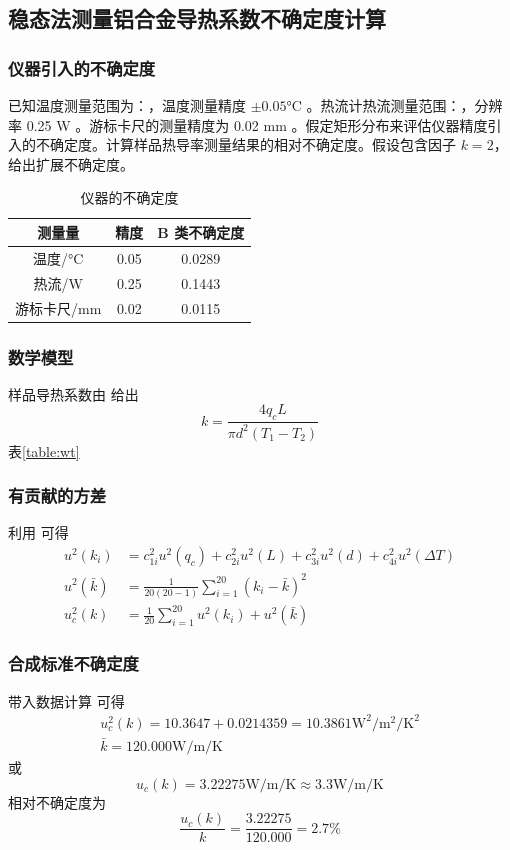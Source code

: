 \documentclass[a4paper,utf8]{article}
\newcommand{\TTR}[0]{\watt\per\m\per\K}
\begin{document}
\subsection{稳态法测量铝合金导热系数不确定度计算}
\subsubsection{仪器引入的不确定度}
已知温度测量范围为：，温度测量精度 $\pm 0.05 \unit{\degreeCelsius}$ 。热流计热流测量范围：\linebreak {}，分辨率 0.25 \unit{\watt} 。游标卡尺的测量精度为 0.02 \unit{\mm} 。假定矩形分布来评估仪器精度引入的不确定度。计算样品热导率测量结果的相对不确定度。假设包含因子 $k=2$，给出扩展不确定度。
\begin{table}[!ht]
    \caption{仪器的不确定度}
    \begin{tabularx}{0.7\textwidth}{*{3}{C}}\toprule
        测量量 & 精度 & B 类不确定度 \\ \midrule
        温度/\unit{\degreeCelsius} & 0.05 & 0.0289 \\
        热流/\unit{\W} & 0.25 & 0.1443 \\
        游标卡尺/\unit{\mm} & 0.02 & 0.0115 \\ \bottomrule
    \end{tabularx}
\end{table}
\subsubsection{数学模型}
    样品导热系数由 给出
    \begin{equation}
        k=\frac{4q_c L}{\pi d^2(T_1-T_2)} \label{eq:4}
    \end{equation}
    表\ref{table:wt}
\subsubsection{有贡献的方差}
利用 可得
\begin{align}
    u^2(k_i)&=c_{1i}^2u^2(q_c)+c_{2i}^2u^2(L)+c_{3i}^2u^2(d)+c_{4i}^2u^2(\Delta T) \\
    u^2(\bar{k})&=\frac{1}{20(20-1)}\sum_{i=1}^{20}(k_i-\bar{k})^2 \\ 
    u_c^2(k)&=\frac{1}{20}\sum_{i=1}^{20}u^2(k_i)+u^2(\bar{k}) \label{eq:5}
\end{align}
\subsubsection{合成标准不确定度}
带入数据计算 可得
\begin{align}
    u_c^2(k)=10.3647+0.0214359=10.3861\unit{\square \W\per\square\m\per\square\K}\\
    \bar{k}=120.000\unit{\TTR}
\end{align}
或
\begin{equation}
    u_c(k)=3.22275\unit{\TTR}\approx 3.3\unit{\TTR}
\end{equation}
相对不确定度为
\begin{equation}
    \frac{u_c(k)}{k}=\frac{3.22275}{120.000}=2.7\%
\end{equation}
\end{document}
